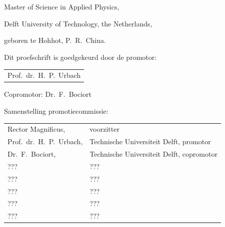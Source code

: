 \begin{titlepage}
\begin{center}
\makeatletter
{\Large\titlefont\bfseries\@firstname\ {\titleshape\@lastname}}
\makeatother
\\
\vspace{3mm}
\begin{CJK*}{UTF8}{gkai}
\makeatletter
{\LARGE\titlefont\bfseries\@lastnameCH\ \hspace{1mm} {\titleshape\@firstnameCH}}
\makeatother
\end{CJK*}

\bigskip
\bigskip

Master of Science in Applied Physics,

Delft University of Technology, the Netherlands,

geboren te Hohhot, P.~R.~China.

\vspace*{2\bigskipamount}

\end{center}

\clearpage
\thispagestyle{empty}

\noindent Dit proefschrift is goedgekeurd door de promotor:

\medskip\noindent
\begin{tabular}{l}
    Prof.\ dr.\ H.\ P.\ Urbach
\end{tabular}

\medskip
\noindent Copromotor: Dr.\ F.\ Bociort

\medskip
\noindent Samenstelling promotiecommissie:

\medskip\noindent
\begin{tabular}{ll}
    Rector Magnificus, & voorzitter \\
    Prof.\ dr.\ H.\ P.\ Urbach, & Technische Universiteit Delft, promotor \\
    Dr.\ F.\ Bociort, & Technische Universiteit Delft, copromotor \\
    ??? & ??? \\
    ??? & ??? \\
    ??? & ??? \\
    ??? & ??? \\
    ??? & ??? \\
\end{tabular}


\end{titlepage}
